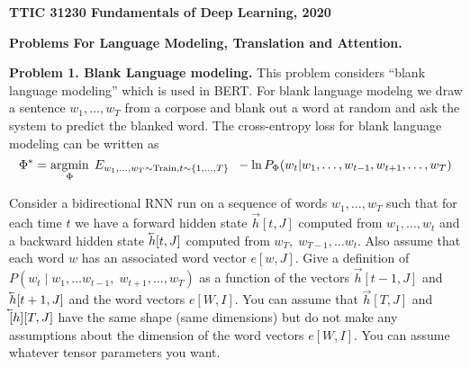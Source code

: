 \documentclass{article}
\newcommand{\solution}[1]{}
\begin{document}
\centerline{\bf TTIC 31230 Fundamentals of Deep Learning, 2020}
\medskip
\centerline{\bf Problems For Language Modeling, Translation and Attention.}

\bigskip

{\bf Problem 1. Blank Language modeling.} This problem considers ``blank language modeling'' which is used in BERT.
For blank language modelng we draw a sentence $w_1,\ldots,w_T$ from a corpose and blank out a word at random
and ask the system to predict the blanked word.  The cross-entropy loss for blank language modeling can be written as
$$\Phi^* = \operatorname*{argmin}_\Phi\;E_{w_1,\ldots,w_T \sim \mathrm{Train}, t \sim \{1,\ldots,T\}}\;\;- \ln P_\Phi(w_t| w_1,\ldots,w_{t-1},w_{t+1},\ldots,w_T)$$
    
Consider a bidirectional RNN run on a sequence of words $w_1,\ldots,w_T$ such that for each time $t$ we have a forward
hidden state $\vec{h}[t,J]$ computed from $w_1,\ldots,w_t$ and a backward hidden state $\cev{h}[t,J]$ computed from $w_T,\;w_{T-1},\ldots w_t$.
Also assume that each word $w$ has an associated word vector $e[w,J]$.
Give a definition of $P(w_t\;|\;w_1,\ldots w_{t-1},\;w_{t+1},\ldots,w_T)$ as a function of
the vectors $\vec{h}[t-1,J]$ and $\cev{h}[t+1,J]$ and the word vectors $e[W,I]$.
You can assume that $\vec{h}[T,J]$ and $\cev[h][T,J]$ have the same shape (same dimensions) but
do not make any assumptions about the dimension of the word vectors $e[W,I]$.
You can assume whatever tensor parameters you want.

\solution{
  There are various acceptable solutions.  A simple one is to assume the parameters include matrices  $\vec{W}[I,J]$ and $\cev{W}[I,J]$.
  Using this convention and the standard convention for matrix-vector products we can then write a solution as
  \begin{eqnarray*}
    & & P_\Phi(w_t| w_1,\ldots,w_{t-1},w_{t+1},\ldots,w_T) \\
    & = & \softmax_{w_t} \;\;e[w_t,I]\vec{W}[I,J]\vec{h}[t-1,J]\; + \; e[w_t,I]\cev{W}[I,J]\cev{h}[t+1,J]
  \end{eqnarray*}
}
\end{document}

